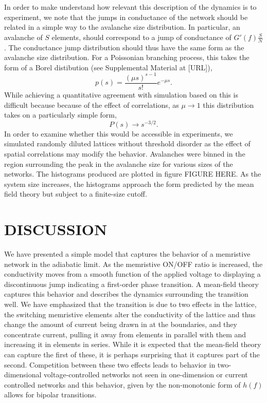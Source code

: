 \documentclass[aps,prl,reprint,groupedaddress]{revtex4-1}
\begin{document}
In order to make understand how relevant this description of the dynamics is to
experiment, we note that the jumps in conductance of the network should be 
related in a simple way to the avalanche size distribution.  In particular,
an avalanche of $S$ elements, should correspond to a jump of conductance of
$G'(f)\frac{S}{N}$.  The conductance jump distribution should thus have the
same form as the avalanche size distribution. For a Poissonian branching
process, this takes the form of a Borel distibution
(see Supplemental Material at [URL]),
\[p(s) = \frac{(\mu s)^{s-1}}{s!}e^{-\mu s}.\]
While achieving a quantitative agreement with simulation based on this is
difficult because because of the effect of correlations,
as $\mu\to 1$ this distribution takes on a particularly simple form,
\[P(s) \to s^{-3/2}.\]
In order to examine whether this would be accessible in experiments, we
simulated randomly diluted lattices without threshold disorder as the
effect of spatial correlations may modify the behavior.  Avalanches were
binned in the region surrounding the peak in the avalanche size for
various sizes of the networks. The histograms produced are plotted in
figure FIGURE HERE. As the system size increases, the histograms approach
the form predicted by the mean field theory but subject to a finite-size
cutoff.

\section{DISCUSSION}

We have presented a simple model that captures the behavior of a memristive
network in the adiabatic limit.  As the memristive ON/OFF ratio is increased,
the conductivity moves from a smooth function of the applied voltage to
displaying a discontinuous jump indicating a first-order phase transition.
A mean-field theory captures this behavior and describes the dynamics
surrounding the transition well.  We have emphasized that the transition is
due to two effects in the lattice, the switching memristive elements alter the
conductivity of the lattice and thus change the amount of current being drawn
in at the boundaries, and they concentrate current, pulling it away from
elements in parallel with them and increasing it in elements in series.  While
it is expected that the mean-field theory can capture the first of these, it
is perhaps surprising that it captures part of the second.  Competition
between these two effects leads to behavior in two-dimensional 
voltage-controlled networks not seen in one-dimension or current controlled
networks and this behavior, given by the non-monotonic form of $h(f)$ allows
for bipolar transitions.
\end{document}

